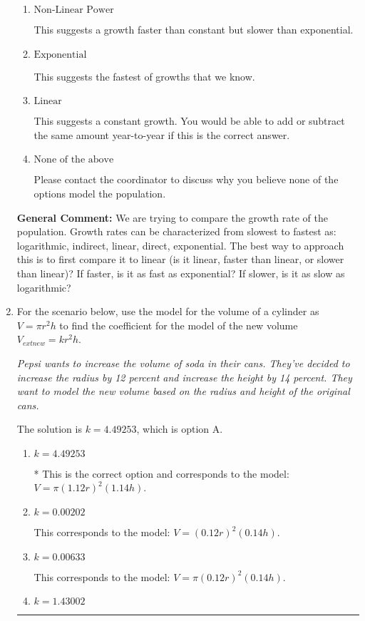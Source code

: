 \documentclass{extbook}[14pt]
\newcommand{\litem}[1]{\item #1

\rule{\textwidth}{0.4pt}}
\begin{document}
\begin{enumerate}
{\begin{enumerate}[label=\Alph*.]
This suggests the slowest of growths that we know.
\item \( \text{Non-Linear Power} \)

This suggests a growth faster than constant but slower than exponential.
\item \( \text{Exponential} \)

This suggests the fastest of growths that we know.
\item \( \text{Linear} \)

This suggests a constant growth. You would be able to add or subtract the same amount year-to-year if this is the correct answer.
\item \( \text{None of the above} \)

Please contact the coordinator to discuss why you believe none of the options model the population.
\end{enumerate}

\textbf{General Comment:} We are trying to compare the growth rate of the population. Growth rates can be characterized from slowest to fastest as: logarithmic, indirect, linear, direct, exponential. The best way to approach this is to first compare it to linear (is it linear, faster than linear, or slower than linear)? If faster, is it as fast as exponential? If slower, is it as slow as logarithmic?
}
\litem{
For the scenario below, use the model for the volume of a cylinder as $V = \pi r^2 h$ to find the coefficient for the model of the new volume $V_{	ext{new}} = k r^2 h$.

\begin{center}
    \textit{ Pepsi wants to increase the volume of soda in their cans. They've decided to increase the radius by 12 percent and increase the height by 14 percent. They want to model the new volume based on the radius and height of the original cans. }
\end{center}
The solution is \( k = 4.49253 \), which is option A.\begin{enumerate}[label=\Alph*.]
\item \( k = 4.49253 \)

* This is the correct option and corresponds to the model: $V = \pi (1.12 r)^2 (1.14 h)$.
\item \( k = 0.00202 \)

This corresponds to the model: $V = (0.12 r)^2 (0.14 h)$.
\item \( k = 0.00633 \)

This corresponds to the model: $V = \pi (0.12 r)^2 (0.14 h)$.
\item \( k = 1.43002 \)


\end{enumerate}}
\end{enumerate}
\end{document}
